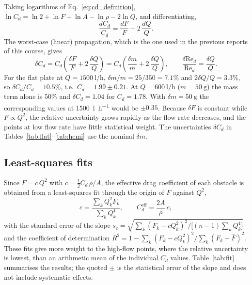 \documentclass[11pt,a4paper]{article}
\numberwithin{equation}{section}
\newcommand{\Cd}{C_d}
\newcommand{\Red}{\mathrm{Re}_d}
\begin{document}
Taking logarithms of Eq.~\eqref{eq:cd_definition}, $\ln\Cd=\ln 2+\ln F+\ln A-\ln\rho-2\ln Q$, and differentiating,
\begin{equation}
  \frac{d\Cd}{\Cd}=\frac{dF}{F}-2\,\frac{dQ}{Q}.
\end{equation}
The worst-case (linear) propagation, which is the one used in the previous reports of this course, gives
\begin{equation}
  \delta\Cd=\Cd\left(\frac{\delta F}{F}+2\,\frac{\delta Q}{Q}\right)=\Cd\left(\frac{\delta m}{m}+2\,\frac{\delta Q}{Q}\right),
  \qquad
  \frac{\delta\Red}{\Red}=\frac{\delta Q}{Q}.
  \label{eq:dcd}
\end{equation}
For the flat plate at $Q=\SI{1500}{\litre\per\hour}$, $\delta m/m=25/350=7.1\%$ and $2\delta Q/Q=3.3\%$, so $\delta\Cd/\Cd=10.5\%$, i.e.\ $\Cd=1.99\pm0.21$. At $Q=\SI{600}{\litre\per\hour}$ ($m=\SI{50}{\gram}$) the mass term alone is $50\%$ and $\delta\Cd=1.04$ for $\Cd=1.78$. With $\delta m=\SI{50}{\gram}$ the corresponding values at \SI{1500}{\litre\per\hour} would be $\pm0.35$. Because $\delta F$ is constant while $F\propto Q^2$, the relative uncertainty grows rapidly as the flow rate decreases, and the points at low flow rate have little statistical weight. The uncertainties $\delta\Cd$ in Tables~\ref{tab:flat}--\ref{tab:hemi} use the nominal $\delta m$.

\subsection{Least-squares fits}

Since $F=c\,Q^2$ with $c=\tfrac12\Cd\,\rho/A$, the effective drag coefficient of each obstacle is obtained from a least-squares fit through the origin of $F$ against $Q^2$,
\begin{equation}
  c=\frac{\sum_k Q_k^2F_k}{\sum_k Q_k^4},\qquad \Cd^{\mathrm{eff}}=\frac{2A}{\rho}\,c ,
  \label{eq:fit}
\end{equation}
with the standard error of the slope $s_c=\sqrt{\sum_k(F_k-cQ_k^2)^2/\big[(n-1)\sum_kQ_k^4\big]}$ and the coefficient of determination $R^2=1-\sum_k(F_k-cQ_k^2)^2/\sum_k(F_k-\bar F)^2$. These fits give more weight to the high-flow points, where the relative uncertainty is lowest, than an arithmetic mean of the individual $\Cd$ values. Table~\ref{tab:fit} summarises the results; the quoted $\pm$ is the statistical error of the slope and does not include systematic effects.
\end{document}
